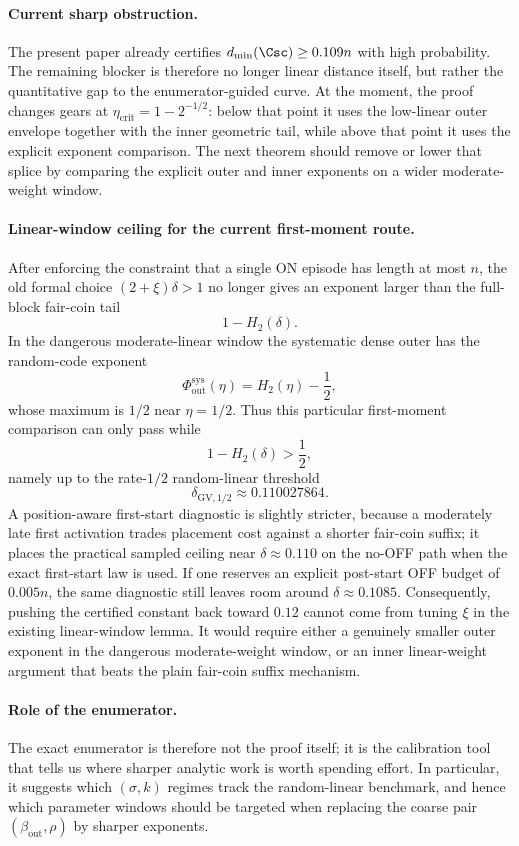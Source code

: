 \paragraph{Current sharp obstruction.}
The present paper already certifies \(d_{\min}(\Csc)\ge 0.109n\) with high probability.
The remaining blocker is therefore no longer linear distance itself, but rather the quantitative gap to the
enumerator-guided curve.
At the moment, the proof changes gears at \(\eta_{\mathrm{crit}}=1-2^{-1/2}\):
below that point it uses the low-linear outer envelope together with the inner geometric tail, while above that point
it uses the explicit exponent comparison.
The next theorem should remove or lower that splice by comparing the explicit outer and inner exponents on a wider
moderate-weight window.

\paragraph{Linear-window ceiling for the current first-moment route.}
After enforcing the constraint that a single ON episode has length at most \(n\), the old formal choice
\((2+\xi)\delta>1\) no longer gives an exponent larger than the full-block fair-coin tail
\[
1-H_2(\delta).
\]
In the dangerous moderate-linear window the systematic dense outer has the random-code exponent
\[
\Phi_{\mathrm{out}}^{\mathrm{sys}}(\eta)=H_2(\eta)-\frac12,
\]
whose maximum is \(1/2\) near \(\eta=1/2\). Thus this particular first-moment comparison can only pass while
\[
1-H_2(\delta)> \frac12,
\]
namely up to the rate-\(1/2\) random-linear threshold
\[
\delta_{\mathrm{GV},1/2}\approx 0.110027864.
\]
A position-aware first-start diagnostic is slightly stricter, because a moderately late first activation trades
placement cost against a shorter fair-coin suffix; it places the practical sampled ceiling near
\(\delta\approx 0.110\) on the no-OFF path when the exact first-start law is used. If one reserves an explicit
post-start OFF budget of \(0.005n\), the same diagnostic still leaves room around \(\delta\approx 0.1085\).
Consequently, pushing the certified constant back toward
\(0.12\) cannot come from tuning \(\xi\) in the existing linear-window lemma. It would require either a genuinely
smaller outer exponent in the dangerous moderate-weight window, or an inner linear-weight argument that beats the
plain fair-coin suffix mechanism.

\paragraph{Role of the enumerator.}
The exact enumerator is therefore not the proof itself; it is the calibration tool that tells us where sharper
analytic work is worth spending effort.
In particular, it suggests which \((\sigma,k)\) regimes track the random-linear benchmark, and hence which parameter
windows should be targeted when replacing the coarse pair \((\beta_{\mathrm{out}},\rho)\) by sharper exponents.

